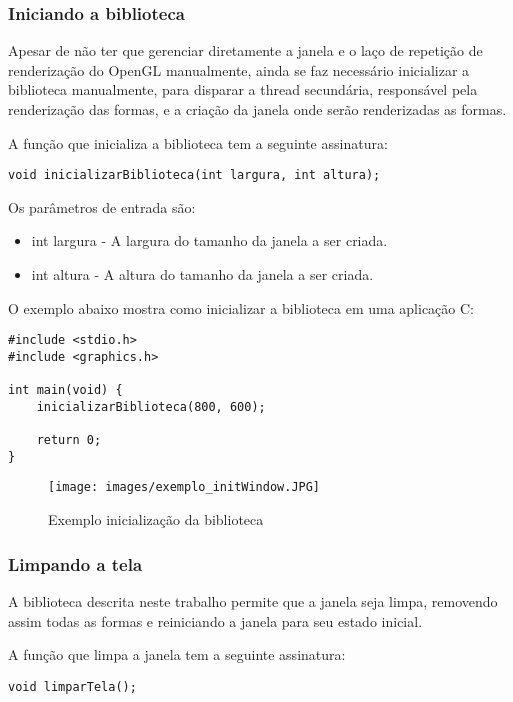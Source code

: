 \documentclass[12pt, %
openright,
oneside, %
a4paper,    %
brazil]{facom-ufu-abntex2}
\begin{document}
\subsubsection{Iniciando a biblioteca}
Apesar de não ter que gerenciar diretamente a janela e o laço de repetição de renderização do OpenGL manualmente, ainda se faz necessário inicializar a biblioteca manualmente, para disparar a thread secundária, responsável pela renderização das formas, e a criação da janela onde serão renderizadas as formas.

A função que inicializa a biblioteca tem a seguinte assinatura:

\begin{lstlisting}
void inicializarBiblioteca(int largura, int altura);
\end{lstlisting}

Os parâmetros de entrada são:

\begin{itemize}
    \item int largura - A largura do tamanho da janela a ser criada.
    \item int altura - A altura do tamanho da janela a ser criada.
\end{itemize}

O exemplo abaixo mostra como inicializar a biblioteca em uma aplicação C:
\begin{lstlisting}
#include <stdio.h>
#include <graphics.h>

int main(void) {
    inicializarBiblioteca(800, 600);
    
    return 0;
}
\end{lstlisting}

\begin{figure}[!htbp]
  \centering
  \texttt{[image: images/exemplo\_initWindow.JPG]}
  \caption{Exemplo inicialização da biblioteca}
  \label{fig:exemplo_initWindow}
\end{figure}

\subsubsection{Limpando a tela}
A biblioteca descrita neste trabalho permite que a janela seja limpa, removendo assim todas as formas e reiniciando a janela para seu estado inicial.

A função que limpa a janela tem a seguinte assinatura:

\begin{lstlisting}
void limparTela();
\end{lstlisting}
\end{document}
